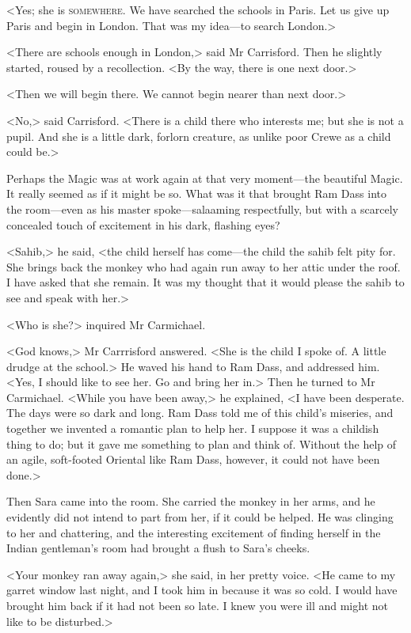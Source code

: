 <Yes; she is \textsc{somewhere}. We have searched the schools in Paris. Let us give up Paris and begin in London. That was my idea—to search London.>

<There are schools enough in London,> said Mr Carrisford. Then he slightly started, roused by a recollection. <By the way, there is one next door.>

<Then we will begin there. We cannot begin nearer than next door.>

<No,> said Carrisford. <There is a child there who interests me; but she is not a pupil. And she is a little dark, forlorn creature, as unlike poor Crewe as a child could be.>

Perhaps the Magic was at work again at that very moment—the beautiful Magic. It really seemed as if it might be so. What was it that brought Ram Dass into the room—even as his master spoke—salaaming respectfully, but with a scarcely concealed touch of excitement in his dark, flashing eyes?

<Sahib,> he said, <the child herself has come—the child the sahib felt pity for. She brings back the monkey who had again run away to her attic under the roof. I have asked that she remain. It was my thought that it would please the sahib to see and speak with her.>

<Who is she?> inquired Mr Carmichael.

<God knows,> Mr Carrrisford answered. <She is the child I spoke of. A little drudge at the school.> He waved his hand to Ram Dass, and addressed him. <Yes, I should like to see her. Go and bring her in.> Then he turned to Mr Carmichael. <While you have been away,> he explained, <I have been desperate. The days were so dark and long. Ram Dass told me of this child's miseries, and together we invented a romantic plan to help her. I suppose it was a childish thing to do; but it gave me something to plan and think of. Without the help of an agile, soft-footed Oriental like Ram Dass, however, it could not have been done.>

Then Sara came into the room. She carried the monkey in her arms, and he evidently did not intend to part from her, if it could be helped. He was clinging to her and chattering, and the interesting excitement of finding herself in the Indian gentleman's room had brought a flush to Sara's cheeks.

<Your monkey ran away again,> she said, in her pretty voice. <He came to my garret window last night, and I took him in because it was so cold. I would have brought him back if it had not been so late. I knew you were ill and might not like to be disturbed.>

